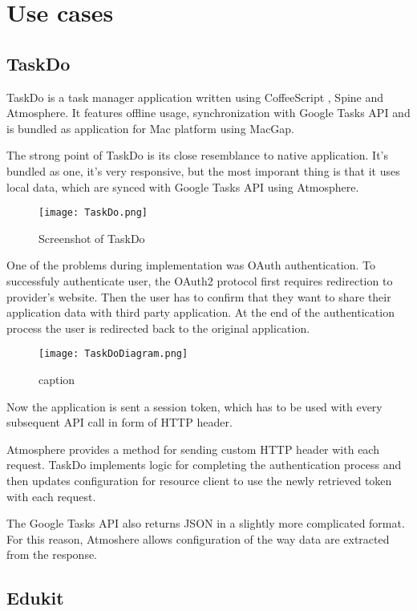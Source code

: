 \section{Use cases}

\subsection{TaskDo}

TaskDo \citep{taskdo} is a task manager application written using CoffeeScript \citep{coffeescript}, Spine \citep{spinejs} and Atmosphere. It features offline usage, synchronization with Google Tasks API \citep{google_tasks} and is bundled as application for Mac platform using MacGap. \citep{macgap}

The strong point of TaskDo is its close resemblance to native application. It's bundled as one, it's very responsive, but the most imporant thing is that it uses local data, which are synced with Google Tasks API using Atmosphere.

\begin{figure}[htbp]
  \centering
    \texttt{[image: TaskDo.png]}
  \caption{Screenshot of TaskDo}
  \label{fig:taskdo}
\end{figure}

One of the problems during implementation was OAuth authentication. To successfuly authenticate user, the OAuth2 protocol \citep{oauth} first requires redirection to provider's website. Then the user has to confirm that they want to share their application data with third party application. At the end of the authentication process the user is redirected back to the original application.

\begin{figure}[ht!]
  \centering
    \texttt{[image: TaskDoDiagram.png]}
  \caption{caption}
  \label{fig:taskdo_diagram}
\end{figure}

Now the application is sent a session token, which has to be used with every subsequent API call in form of HTTP header.

Atmosphere provides a method for sending custom HTTP header with each request. TaskDo implements logic for completing the authentication process and then updates configuration for resource client to use the newly retrieved token with each request.

The Google Tasks API also returns JSON in a slightly more complicated format. For this reason, Atmoshere allows configuration of the way data are extracted from the response.

\subsection{Edukit}

